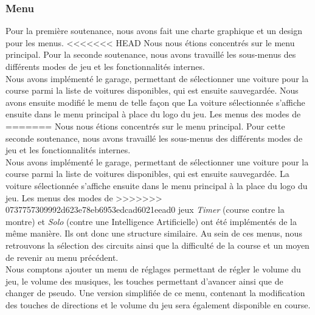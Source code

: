 \documentclass[a4paper,12pt]{article}
\newcommand{\AI}{Intelligence Artificielle}
\begin{document}
            \subsubsection{Menu}
                Pour la première soutenance, nous avons fait une charte graphique et un design pour les 
                menus.
<<<<<<< HEAD
                Nous nous étions concentrés sur le menu principal. Pour la seconde soutenance, nous 
                avons travaillé les sous-menus des différents modes de jeu et les fonctionnalités internes.\\
                Nous avons implémenté le garage, permettant de sélectionner une voiture pour la course parmi 
                la liste de voitures disponibles, qui est ensuite sauvegardée. 
                Nous avons ensuite modifié le menu de telle façon que La voiture sélectionnée s'affiche 
                ensuite dans le menu principal à place du logo du jeu. Les menus des modes de
=======
                Nous nous étions concentrés sur le menu principal. Pour cette seconde soutenance, nous 
                avons travaillé les
                sous-menus des différents modes de jeu et les fonctionnalités internes.\\
                Nous avons implémenté le garage, permettant de
                sélectionner une voiture pour la course parmi la liste de voitures disponibles, qui
                est ensuite sauvegardée. La voiture sélectionnée s'affiche ensuite dans le menu principal
                à la place du logo du jeu. Les menus des modes de
>>>>>>> 0737757309992d623e78eb6953edcad6021eead0
                jeux \textsl{Timer} (course contre la montre) et \textsl{Solo} (contre une \AI) ont
                été implémentés de la même manière. Ils ont donc une structure similaire. Au sein de
                ces menus, nous retrouvons la sélection des circuits ainsi que la difficulté de la course et
                un moyen de revenir au menu précédent.\\
                Nous comptons ajouter un menu de réglages permettant de régler le volume du jeu, le volume
                des musiques, les touches permettant d'avancer ainsi que de changer de pseudo. Une 
                version simplifiée de ce menu, contenant la modification des touches de directions et le
                volume du jeu sera également disponible en course.
\end{document}
